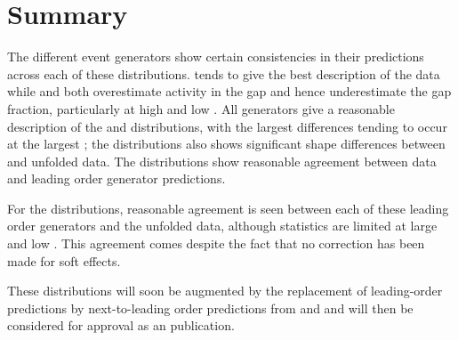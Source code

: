 \section{Summary}
The different \MC event generators show certain consistencies in their predictions
across each of these distributions. \Pythia tends to give the best description of
the data while \Herwigpp and \Alpgen both overestimate activity in the gap and hence
underestimate the gap fraction, particularly at high \DeltaY and low \Qnought. All
generators give a reasonable description of the
\meanCosDPhi and \meanCosTwoDPhi distributions, with the largest differences tending
to occur at the largest \DeltaY; the \meanCosTwoDPhi distributions also shows significant
shape differences between \Pythia and unfolded data. The \xs distributions show reasonable agreement between
data and leading order \MC generator predictions.

For the \xs distributions, reasonable agreement is seen between each of these
leading order \MC generators and the unfolded data, although statistics are limited
at large \DeltaY and low \DeltaPhi. This agreement comes despite the fact that no
correction has been made for soft effects.

These distributions will soon be augmented by the replacement of leading-order
\MC predictions by next-to-leading order predictions from \Powheg and \HEJ and
will then be considered for approval as an \ATLAS publication.
